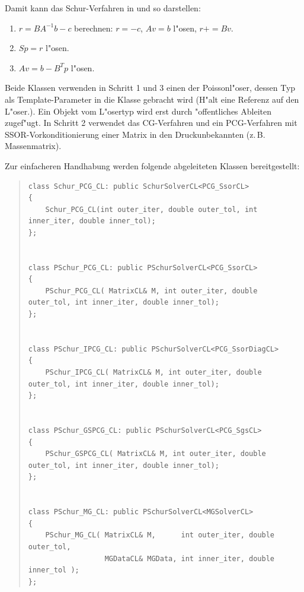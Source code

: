\documentclass[11pt,a4paper]{article}
\newenvironment{Code}{\begin{quote}\scriptsize}{\end{quote}}
\begin{document}
Damit kann das Schur-Verfahren in  und  so
darstellen:
\begin{enumerate}
\item $r= BA^{-1}b -c$ berechnen: \quad $r= -c$, $Av = b$ l"osen, $r+= Bv$.
\item $Sp=r$ l"osen.
\item $Av = b - B^Tp$ l"osen.
\end{enumerate}
Beide Klassen verwenden in Schritt 1 und 3 einen der Poissonl"oser,
dessen Typ als Template-Parameter in die Klasse gebracht wird (H"alt
eine Referenz auf den L"oser.). Ein Objekt vom L"osertyp wird
erst durch "offentliches Ableiten zugef"ugt. In Schritt 2 verwendet
 das CG-Verfahren und  ein
PCG-Verfahren mit SSOR-Vorkonditionierung einer Matrix in den Druckunbekannten 
(z.\,B. Massenmatrix).

Zur einfacheren Handhabung werden folgende abgeleiteten Klassen bereitgestellt:
\begin{Code}
\begin{verbatim}
class Schur_PCG_CL: public SchurSolverCL<PCG_SsorCL>
{
    Schur_PCG_CL(int outer_iter, double outer_tol, int inner_iter, double inner_tol);
};


class PSchur_PCG_CL: public PSchurSolverCL<PCG_SsorCL>
{
    PSchur_PCG_CL( MatrixCL& M, int outer_iter, double outer_tol, int inner_iter, double inner_tol);
};


class PSchur_IPCG_CL: public PSchurSolverCL<PCG_SsorDiagCL>
{
    PSchur_IPCG_CL( MatrixCL& M, int outer_iter, double outer_tol, int inner_iter, double inner_tol);
};


class PSchur_GSPCG_CL: public PSchurSolverCL<PCG_SgsCL>
{
    PSchur_GSPCG_CL( MatrixCL& M, int outer_iter, double outer_tol, int inner_iter, double inner_tol);
};


class PSchur_MG_CL: public PSchurSolverCL<MGSolverCL>
{
    PSchur_MG_CL( MatrixCL& M,      int outer_iter, double outer_tol, 
                  MGDataCL& MGData, int inner_iter, double inner_tol );
};
\end{verbatim}
\end{Code}
\end{document}
